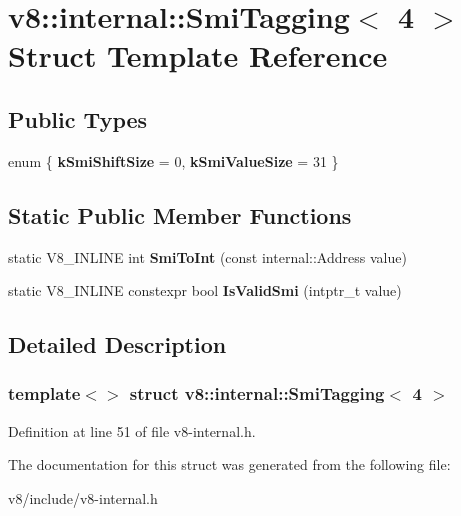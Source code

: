 \hypertarget{structv8_1_1internal_1_1SmiTagging_3_014_01_4}{}\section{v8\+:\+:internal\+:\+:Smi\+Tagging$<$ 4 $>$ Struct Template Reference}
\label{structv8_1_1internal_1_1SmiTagging_3_014_01_4}
\subsection*{Public Types}
\begin{DoxyCompactItemize}
\item 
\mbox{\label{structv8_1_1internal_1_1SmiTagging_3_014_01_4_aa2b64cedd7f894f6964fe11746b029e4}} 
enum \{ {\bfseries k\+Smi\+Shift\+Size} = 0, 
{\bfseries k\+Smi\+Value\+Size} = 31
 \}
\end{DoxyCompactItemize}
\subsection*{Static Public Member Functions}
\begin{DoxyCompactItemize}
\item 
\mbox{\label{structv8_1_1internal_1_1SmiTagging_3_014_01_4_ad306fdee17af069303cc78be3defa400}} 
static V8\+\_\+\+I\+N\+L\+I\+NE int {\bfseries Smi\+To\+Int} (const internal\+::\+Address value)
\item 
\mbox{\label{structv8_1_1internal_1_1SmiTagging_3_014_01_4_af100af8e269bbeee8c7e12b28d388b4e}} 
static V8\+\_\+\+I\+N\+L\+I\+NE constexpr bool {\bfseries Is\+Valid\+Smi} (intptr\+\_\+t value)
\end{DoxyCompactItemize}


\subsection{Detailed Description}
\subsubsection*{template$<$$>$\newline
struct v8\+::internal\+::\+Smi\+Tagging$<$ 4 $>$}



Definition at line 51 of file v8-\/internal.\+h.



The documentation for this struct was generated from the following file\+:\begin{DoxyCompactItemize}
\item 
v8/include/v8-\/internal.\+h\end{DoxyCompactItemize}
